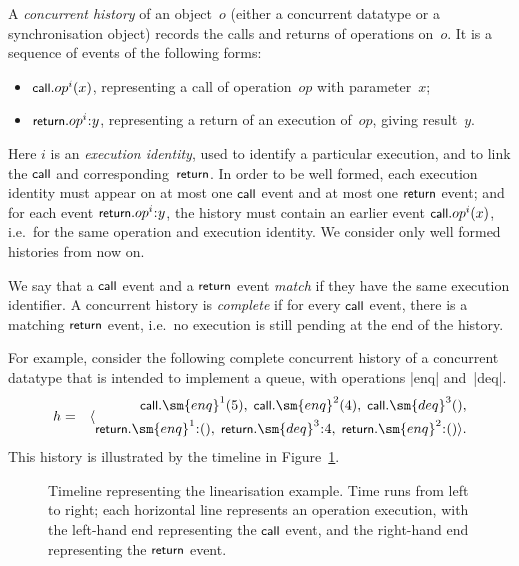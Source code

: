A \emph{concurrent history} of an object~$o$ (either a concurrent datatype or
a synchronisation object) records the calls and returns of operations on~$o$.
It is a sequence of events of the following forms:
%
\begin{itemize}
\item $\mbox{\sf{\small call}}.op^i(x)$, representing a call of operation~$op$ with
  parameter~$x$;
\item $\return.op^i \:: y$, representing a return of an execution of~$op$,
  giving result~$y$.
\end{itemize}
%
Here $i$ is an \emph{execution identity}, used to identify a particular
execution, and to link the $\mbox{\sf{\small call}}$ and corresponding~$\mbox{\sf{\small return}}$.  In order to
be well formed, each execution identity must appear on at most one $\mbox{\sf{\small call}}$
event and at most one $\mbox{\sf{\small return}}$ event; and for each event $\return.op^i\::y$,
the history must contain an earlier event $\mbox{\sf{\small call}}.op^i(x)$, i.e.~for the same
operation and execution identity.  We consider only well formed histories
from now on.  

We say that a $\mbox{\sf{\small call}}$ event and a $\mbox{\sf{\small return}}$ event \emph{match}
if they have the same execution identifier.  A concurrent history is
\emph{complete} if for every $\mbox{\sf{\small call}}$ event, there is a matching $\mbox{\sf{\small return}}$
event, i.e.~no execution is still pending at the end of the history.

For example, consider the following complete concurrent history of a
concurrent datatype that is intended to implement a queue, with operations
|enq| and~|deq|.
%
\begin{eqnarray*}
h & = & 
  \seq{\begin{align}
    \call.\sm{enq}^1(5),\; \call.\sm{enq}^2(4),\; \call.\sm{deq}^3(), \\
    \return.\sm{enq}^1\::(),\; \return.\sm{deq}^3\::4,\;
    \return.\sm{enq}^2\::() }.
    \end{align}
\end{eqnarray*}
%
This history is illustrated by the timeline in Figure~\ref{fig:lin-timeline}.


\begin{figure}
\unScalaMid
\begin{center}
\end{center}
\caption{Timeline representing the linearisation example.  Time runs from left
  to right; each horizontal line represents an operation execution, with the
  left-hand end representing the $\mbox{\sf{\small call}}$ event, and the right-hand end
  representing the $\mbox{\sf{\small return}}$ event.}
\label{fig:lin-timeline}
\scalaMid
\end{figure}

